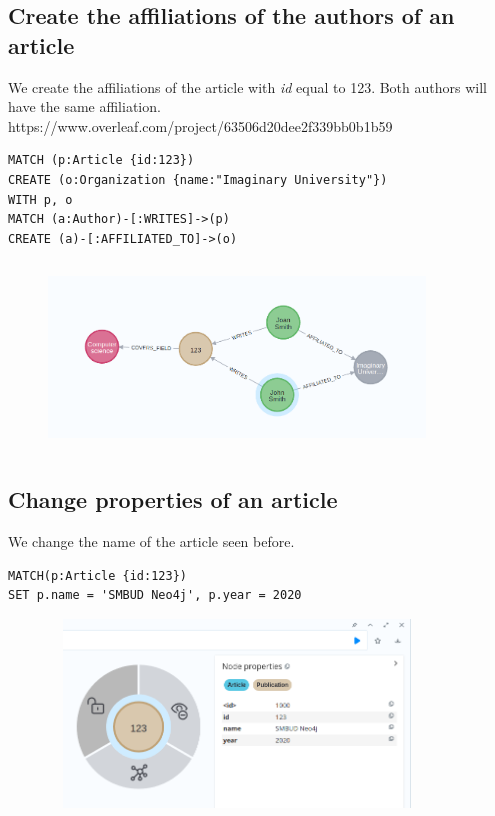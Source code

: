 \documentclass{Configuration_Files/PoliMi3i_thesis}
\begin{document}
\subsection{Create the affiliations of the authors of an article}
We create the affiliations of the article with \textit{id} equal to 123. Both authors will have the same affiliation.\\https://www.overleaf.com/project/63506d20dee2f339bb0b1b59
\begin{lstlisting}[language=cypher, label=lst:cypher-example]
MATCH (p:Article {id:123})
CREATE (o:Organization {name:"Imaginary University"})
WITH p, o
MATCH (a:Author)-[:WRITES]->(p)
CREATE (a)-[:AFFILIATED_TO]->(o)
\end{lstlisting}
\begin{figure}[H]
    \centering
    \includegraphics[width=100mm, height=50mm]{Images/create_4.png}
        \caption{}
    \label{fig:quadtree}
\end{figure}
\subsection{Change properties of an article}
We change the name of the article seen before.\\
\begin{lstlisting}[language=cypher, label=lst:cypher-example]
MATCH(p:Article {id:123})
SET p.name = 'SMBUD Neo4j', p.year = 2020
\end{lstlisting}
\begin{figure}[H]
    \centering
    \includegraphics[width=100mm, height=50mm]{Images/create_5.png}
        \caption{}
    \label{fig:quadtree}
\end{figure}
\end{document}
